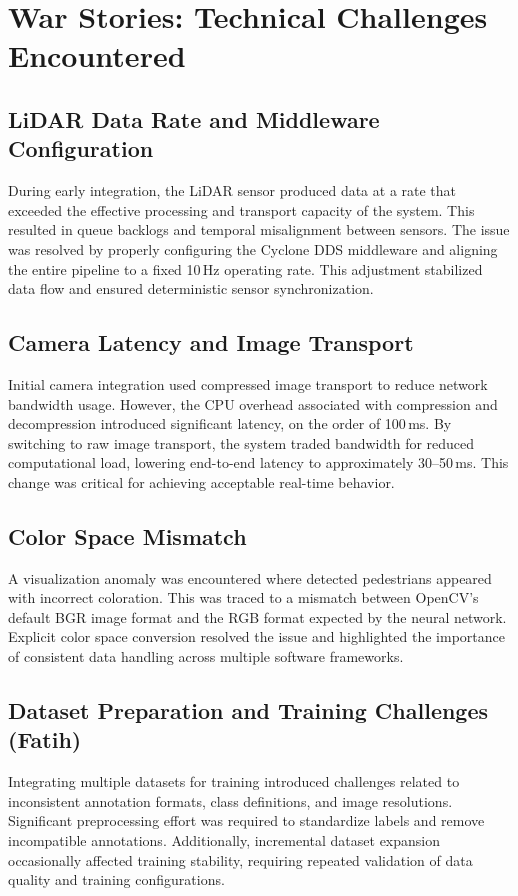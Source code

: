 \documentclass[12pt,a4paper]{report}
\begin{document}
{\section{War Stories: Technical Challenges Encountered}

\subsection{LiDAR Data Rate and Middleware Configuration}
During early integration, the LiDAR sensor produced data at a rate that exceeded the effective processing and transport capacity of the system. This resulted in queue backlogs and temporal misalignment between sensors. The issue was resolved by properly configuring the Cyclone DDS middleware and aligning the entire pipeline to a fixed 10\,Hz operating rate. This adjustment stabilized data flow and ensured deterministic sensor synchronization.

\subsection{Camera Latency and Image Transport}
Initial camera integration used compressed image transport to reduce network bandwidth usage. However, the CPU overhead associated with compression and decompression introduced significant latency, on the order of 100\,ms. By switching to raw image transport, the system traded bandwidth for reduced computational load, lowering end-to-end latency to approximately 30--50\,ms. This change was critical for achieving acceptable real-time behavior.

\subsection{Color Space Mismatch}
A visualization anomaly was encountered where detected pedestrians appeared with incorrect coloration. This was traced to a mismatch between OpenCV’s default BGR image format and the RGB format expected by the neural network. Explicit color space conversion resolved the issue and highlighted the importance of consistent data handling across multiple software frameworks.

\subsection{Dataset Preparation and Training Challenges (Fatih)}
Integrating multiple datasets for training introduced challenges related to inconsistent annotation formats, class definitions, and image resolutions. Significant preprocessing effort was required to standardize labels and remove incompatible annotations. Additionally, incremental dataset expansion occasionally affected training stability, requiring repeated validation of data quality and training configurations.

}
\end{document}
